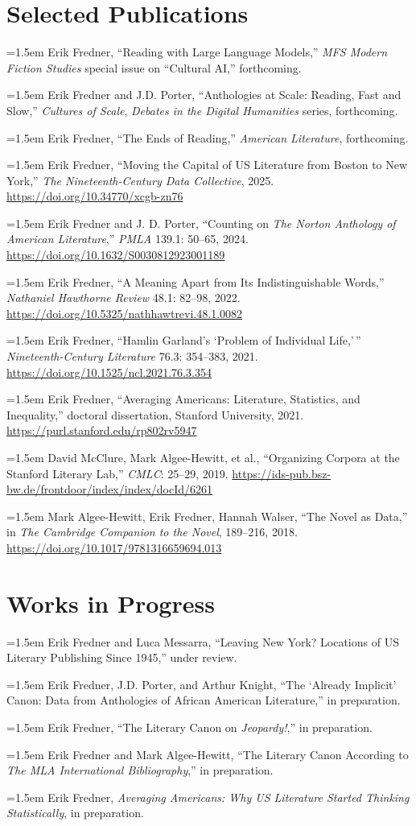 \documentclass[12pt, letterpaper]{article}
\newcommand{\pubentry}[1]{\hangindent=1.5em\hangafter=1 #1\par}
\begin{document}
\section{Selected Publications}
\pubentry{Erik Fredner, ``Reading with Large Language Models,'' \textit{MFS Modern Fiction Studies} special issue on ``Cultural AI,'' forthcoming.}
\pubentry{Erik Fredner and J.D. Porter, ``Anthologies at Scale: Reading, Fast and Slow,'' \textit{Cultures of Scale}, \textit{Debates in the Digital Humanities} series, forthcoming.}
\pubentry{Erik Fredner, ``The Ends of Reading,'' \textit{American Literature}, forthcoming.}
\pubentry{Erik Fredner, ``Moving the Capital of US Literature from Boston to New York,'' \textit{The Nineteenth-Century Data Collective}, 2025. \url{https://doi.org/10.34770/xcgb-zn76}}
\pubentry{Erik Fredner and J. D. Porter, ``Counting on \textit{The Norton Anthology of American Literature},'' \textit{PMLA} 139.1: 50--65, 2024. \url{https://doi.org/10.1632/S0030812923001189}}
\pubentry{Erik Fredner, ``A Meaning Apart from Its Indistinguishable Words,'' \textit{Nathaniel Hawthorne Review} 48.1: 82--98, 2022. \url{https://doi.org/10.5325/nathhawtrevi.48.1.0082}}
\pubentry{Erik Fredner, ``Hamlin Garland's `Problem of Individual Life,'\,'' \textit{Nineteenth-Century Literature} 76.3: 354--383, 2021. \url{https://doi.org/10.1525/ncl.2021.76.3.354}}
\pubentry{Erik Fredner, ``Averaging Americans: Literature, Statistics, and Inequality,'' doctoral dissertation, Stanford University, 2021. \url{https://purl.stanford.edu/rp802rv5947}}
\pubentry{David McClure, Mark Algee-Hewitt, et al., ``Organizing Corpora at the Stanford Literary Lab,'' \textit{CMLC}: 25--29, 2019. \url{https://ids-pub.bsz-bw.de/frontdoor/index/index/docId/6261}}
\pubentry{Mark Algee-Hewitt, Erik Fredner, Hannah Walser, ``The Novel as Data,'' in \textit{The Cambridge Companion to the Novel}, 189--216, 2018. \url{https://doi.org/10.1017/9781316659694.013}}

\section{Works in Progress}
\pubentry{Erik Fredner and Luca Messarra, ``Leaving New York? Locations of US Literary Publishing Since 1945,'' under review.}
\pubentry{Erik Fredner, J.D. Porter, and Arthur Knight, ``The `Already Implicit' Canon: Data from Anthologies of African American Literature,'' in preparation.}
\pubentry{Erik Fredner, ``The Literary Canon on \textit{Jeopardy!},'' in preparation.}
\pubentry{Erik Fredner and Mark Algee-Hewitt, ``The Literary Canon According to \textit{The MLA International Bibliography},'' in preparation.}
\pubentry{Erik Fredner, \textit{Averaging Americans: Why US Literature Started Thinking Statistically}, in preparation.}
\end{document}
